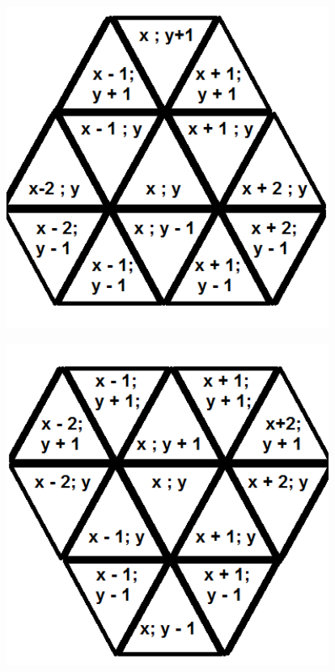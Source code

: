 \documentclass{article}
\newenvironment{Figure}
  {\par\medskip\noindent\minipage{\linewidth}}
  {\endminipage\par\medskip}
\begin{document}
\begin{multicols}{2}
\begin{Figure}
 \includegraphics[width=0.79\textwidth]{imgs/triangle1.png}
\label{fig:cartesianstd}
\end{Figure}
\begin{Figure}
 \centering
 \includegraphics[width=0.79\textwidth]{imgs/triangle2.png}
\label{fig:cartesianstd}
\end{Figure}


\end{multicols}
\end{document}
